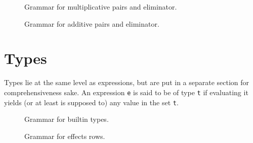 \begin{figure}[H]
	\centering


	\caption{Grammar for multiplicative pairs and eliminator.}
	\label{fig:zilch-grammar-expressions-pairs-mult-grammar}
\end{figure}

\begin{figure}[H]
	\centering


	\caption{Grammar for additive pairs and eliminator.}
	\label{fig:zilch-grammar-expressions-pairs-add-grammar}
\end{figure}

\section{Types}\label{sec:zilch-grammar-types}

Types lie at the same level as expressions, but are put in a separate section for comprehensiveness sake.
An expression \verb|e| is said to be of type \verb|t| if evaluating it yields (or at least is supposed to) any value in the set \verb|t|.

\begin{figure}[H]
	\centering


	\caption{Grammar for builtin types.}
	\label{fig:zilch-grammar-types-builtin-grammar}
\end{figure}

\begin{figure}[H]
	\centering


	\caption{Grammar for effects rows.}
	\label{fig:zilch-grammar-types-effectrow-grammar}
\end{figure}

